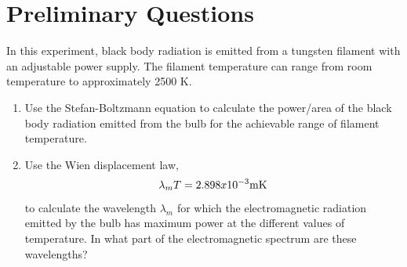\section{Preliminary Questions}


In this experiment, black body radiation is emitted from a tungsten filament with an adjustable power supply.    The filament temperature can range from room temperature to approximately 2500 K.

\begin{enumerate}
\item Use the Stefan-Boltzmann equation to calculate the power/area of the
black body radiation emitted from the bulb for the achievable range of filament temperature.


\item Use the Wien displacement law,
\begin{equation}
\lambda_m T = 2.898 x 10^{-3}  {\rm m} {\rm K}
\end{equation}
to calculate the wavelength $\lambda_m$ for which the
electromagnetic radiation emitted by the bulb has maximum power at the different values of temperature.  In
what part of the electromagnetic spectrum are these wavelengths?
\end{enumerate}


